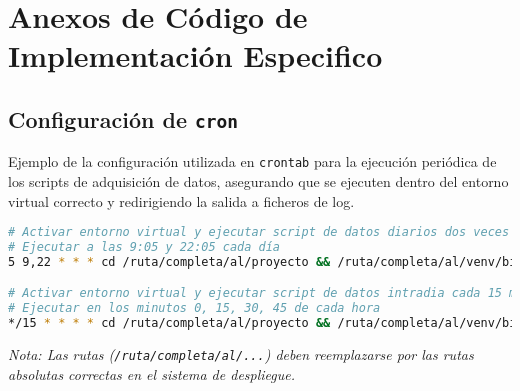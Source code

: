 \chapter{Anexos de Código de Implementación Especifico} %
\label{anexo:implementacion_detalles} %

\section{Configuración de \texttt{cron}}
\label{annex:code:crontab}
Ejemplo de la configuración utilizada en \texttt{crontab} para la ejecución periódica de los scripts de adquisición de datos, asegurando que se ejecuten dentro del entorno virtual correcto y redirigiendo la salida a ficheros de log.
\begin{lstlisting}[language=bash, caption={Ejemplo de configuración de crontab para scripts de adquisición.}, label={lst:crontab_example}]
# Activar entorno virtual y ejecutar script de datos diarios dos veces al dia
# Ejecutar a las 9:05 y 22:05 cada día
5 9,22 * * * cd /ruta/completa/al/proyecto && /ruta/completa/al/venv/bin/python fitbit.py >> /ruta/completa/al/proyecto/logs/cron_daily.log 2>&1

# Activar entorno virtual y ejecutar script de datos intradia cada 15 minutos
# Ejecutar en los minutos 0, 15, 30, 45 de cada hora
*/15 * * * * cd /ruta/completa/al/proyecto && /ruta/completa/al/venv/bin/python fitbit_intraday.py >> /ruta/completa/al/proyecto/logs/cron_intraday.log 2>&1
\end{lstlisting}
\textit{Nota: Las rutas (\texttt{/ruta/completa/al/...}) deben reemplazarse por las rutas absolutas correctas en el sistema de despliegue.}

